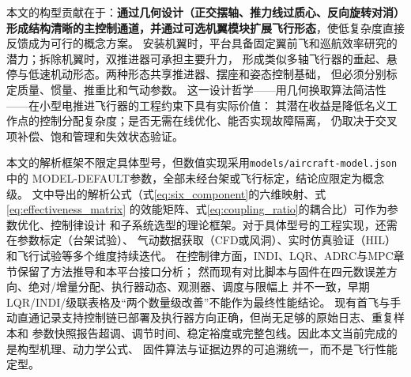 本文的构型贡献在于：\textbf{通过几何设计（正交摆轴、推力线过质心、反向旋转对消）
形成结构清晰的主控制通道，并通过可选机翼模块扩展飞行形态}，使低复杂度直接反馈成为可行的概念方案。
安装机翼时，平台具备固定翼前飞和巡航效率研究的潜力；拆除机翼时，双推进器可承担主要升力，
形成类似多轴飞行器的垂起、悬停与低速机动形态。两种形态共享推进器、摆座和姿态控制基础，
但必须分别标定质量、惯量、推重比和气动参数。
这一设计哲学——用几何换取算法简洁性——在小型电推进飞行器的工程约束下具有实际价值：
其潜在收益是降低名义工作点的控制分配复杂度；是否无需在线优化、能否实现故障隔离，
仍取决于交叉项补偿、饱和管理和失效状态验证。

本文的解析框架不限定具体型号，但数值实现采用\texttt{models/aircraft-model.json}中的
MODEL-DEFAULT参数，全部未经台架或飞行标定，结论应限定为概念级。
文中导出的解析公式（式\ref{eq:six_component}的六维映射、式\ref{eq:effectiveness_matrix}
的效能矩阵、式\ref{eq:coupling_ratio}的耦合比）可作为参数优化、控制律设计
和子系统选型的理论框架。对于具体型号的工程实现，还需在参数标定（台架试验）、
气动数据获取（CFD或风洞）、实时仿真验证（HIL）和飞行试验等多个维度持续迭代。
在控制律方面，INDI、LQR、ADRC与MPC章节保留了方法推导和本平台接口分析；
然而现有对比脚本与固件在四元数误差方向、绝对/增量分配、执行器动态、观测器、调度与限幅上
并不一致，早期LQR/INDI/级联表格及“两个数量级改善”不能作为最终性能结论。
现有首飞与手动直通记录支持控制链已部署及执行器方向正确，但尚无足够的原始日志、重复样本和
参数快照报告超调、调节时间、稳定裕度或完整包线。因此本文当前完成的是构型机理、动力学公式、
固件算法与证据边界的可追溯统一，而不是飞行性能定型。
